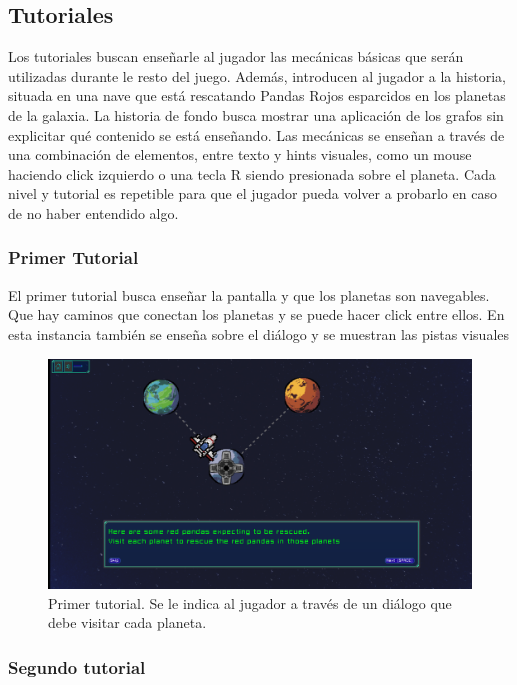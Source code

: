 \subsection{Tutoriales}

Los tutoriales buscan enseñarle al jugador las mecánicas básicas que serán utilizadas durante le resto del juego. Además, introducen al jugador a la historia, situada en una nave que está rescatando Pandas Rojos esparcidos en los planetas de la galaxia. La historia de fondo busca mostrar una aplicación de los grafos sin explicitar qué contenido se está enseñando.
Las mecánicas se enseñan a través de una combinación de elementos, entre texto y hints visuales, como un mouse haciendo click izquierdo o una tecla R siendo presionada sobre el planeta.
Cada nivel y tutorial es repetible para que el jugador pueda volver a probarlo en caso de no haber entendido algo.

\subsubsection{Primer Tutorial}

El primer tutorial busca enseñar la pantalla y que los planetas son navegables. Que hay caminos que conectan los planetas y se puede hacer click entre ellos. En esta instancia también se enseña sobre el diálogo y se muestran las pistas visuales


\begin{figure}[h]
	\centering
	\includegraphics[scale=0.3]{imagenes/FirstTutorial.png}
	\caption{Primer tutorial. Se le indica al jugador a través de un diálogo que debe visitar cada planeta.}
	\label{FirstTutorial}
\end{figure}



\subsubsection{Segundo tutorial}

